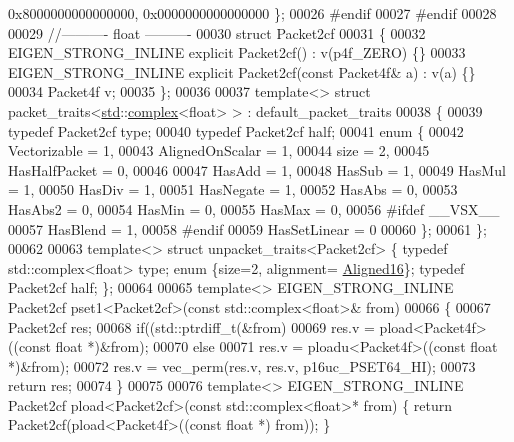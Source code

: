 \begin{DoxyCode}
{       0x8000000000000000, 0x0000000000000000 \};}
00026 \textcolor{preprocessor}{#endif}
00027 \textcolor{preprocessor}{#endif}
00028 
00029 \textcolor{comment}{//---------- float ----------}
00030 \textcolor{keyword}{struct }Packet2cf
00031 \{
00032   EIGEN\_STRONG\_INLINE \textcolor{keyword}{explicit} Packet2cf() : v(p4f\_ZERO) \{\}
00033   EIGEN\_STRONG\_INLINE \textcolor{keyword}{explicit} Packet2cf(\textcolor{keyword}{const} Packet4f& a) : v(a) \{\}
00034   Packet4f  v;
00035 \};
00036 
00037 \textcolor{keyword}{template}<> \textcolor{keyword}{struct }packet\_traits<\hyperlink{namespacestd}{std}::\hyperlink{structcomplex}{complex}<float> >  : default\_packet\_traits
00038 \{
00039   \textcolor{keyword}{typedef} Packet2cf type;
00040   \textcolor{keyword}{typedef} Packet2cf half;
00041   \textcolor{keyword}{enum} \{
00042     Vectorizable = 1,
00043     AlignedOnScalar = 1,
00044     size = 2,
00045     HasHalfPacket = 0,
00046 
00047     HasAdd    = 1,
00048     HasSub    = 1,
00049     HasMul    = 1,
00050     HasDiv    = 1,
00051     HasNegate = 1,
00052     HasAbs    = 0,
00053     HasAbs2   = 0,
00054     HasMin    = 0,
00055     HasMax    = 0,
00056 \textcolor{preprocessor}{#ifdef \_\_VSX\_\_}
00057     HasBlend  = 1,
00058 \textcolor{preprocessor}{#endif}
00059     HasSetLinear = 0
00060   \};
00061 \};
00062 
00063 \textcolor{keyword}{template}<> \textcolor{keyword}{struct }unpacket\_traits<Packet2cf> \{ \textcolor{keyword}{typedef} std::complex<float> type; \textcolor{keyword}{enum} \{size=2, alignment=
      \hyperlink{group__enums_gga45fe06e29902b7a2773de05ba27b47a1af8e2bf74b04c02199f62c5e3c06dbfcc}{Aligned16}\}; \textcolor{keyword}{typedef} Packet2cf half; \};
00064 
00065 \textcolor{keyword}{template}<> EIGEN\_STRONG\_INLINE Packet2cf pset1<Packet2cf>(\textcolor{keyword}{const} std::complex<float>&  from)
00066 \{
00067   Packet2cf res;
00068   \textcolor{keywordflow}{if}((std::ptrdiff\_t(&from) %
00069     res.v = pload<Packet4f>((\textcolor{keyword}{const} \textcolor{keywordtype}{float} *)&from);
00070   \textcolor{keywordflow}{else}
00071     res.v = ploadu<Packet4f>((\textcolor{keyword}{const} \textcolor{keywordtype}{float} *)&from);
00072   res.v = vec\_perm(res.v, res.v, p16uc\_PSET64\_HI);
00073   \textcolor{keywordflow}{return} res;
00074 \}
00075 
00076 \textcolor{keyword}{template}<> EIGEN\_STRONG\_INLINE Packet2cf pload<Packet2cf>(\textcolor{keyword}{const} std::complex<float>*        from) \{ \textcolor{keywordflow}{return} 
      Packet2cf(pload<Packet4f>((\textcolor{keyword}{const} \textcolor{keywordtype}{float} *) from)); \}

\end{DoxyCode}
